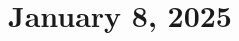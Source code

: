 \documentclass[11pt]{article} \usepackage{lindrew}
\begin{document}
\section{January 8, 2025}
\end{document}
